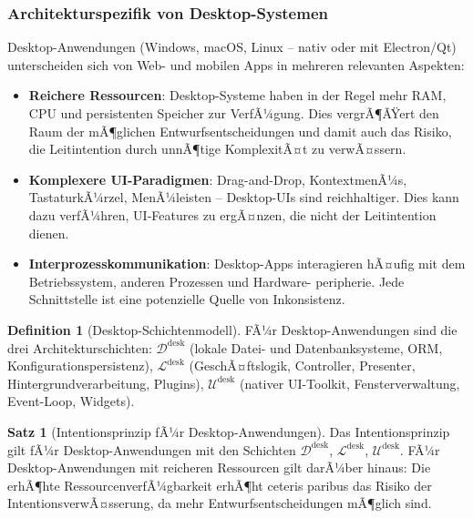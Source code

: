 ﻿\documentclass[a4paper,12pt]{article}
\theoremstyle{definition}
\newtheorem{definition}{Definition}
\newtheorem{satz}{Satz}
\begin{document}
\subsubsection{Architekturspezifik von Desktop-Systemen}

Desktop-Anwendungen (Windows, macOS, Linux -- nativ oder mit Electron/Qt)
unterscheiden sich von Web- und mobilen Apps in mehreren relevanten Aspekten:

\begin{itemize}
    \item \textbf{Reichere Ressourcen}: Desktop-Systeme haben in der Regel
          mehr RAM, CPU und persistenten Speicher zur VerfÃ¼gung. Dies vergrÃ¶ÃŸert
          den Raum der mÃ¶glichen Entwurfsentscheidungen und damit auch das
          Risiko, die Leitintention durch unnÃ¶tige KomplexitÃ¤t zu verwÃ¤ssern.
    \item \textbf{Komplexere UI-Paradigmen}: Drag-and-Drop, KontextmenÃ¼s,
          TastaturkÃ¼rzel, MenÃ¼leisten -- Desktop-UIs sind reichhaltiger.
          Dies kann dazu verfÃ¼hren, UI-Features zu ergÃ¤nzen, die nicht der
          Leitintention dienen.
    \item \textbf{Interprozesskommunikation}: Desktop-Apps interagieren
          hÃ¤ufig mit dem Betriebssystem, anderen Prozessen und Hardware-
          peripherie. Jede Schnittstelle ist eine potenzielle Quelle von
          Inkonsistenz.
\end{itemize}

\begin{definition}[Desktop-Schichtenmodell]
FÃ¼r Desktop-Anwendungen sind die drei Architekturschichten:
$\mathcal{D}^{\text{desk}}$ (lokale Datei- und Datenbanksysteme, ORM,
Konfigurationspersistenz),
$\mathcal{L}^{\text{desk}}$ (GeschÃ¤ftslogik, Controller, Presenter,
Hintergrundverarbeitung, Plugins),
$\mathcal{U}^{\text{desk}}$ (nativer UI-Toolkit, Fensterverwaltung,
Event-Loop, Widgets).
\end{definition}

\begin{satz}[Intentionsprinzip fÃ¼r Desktop-Anwendungen]\label{satz:desktop}
Das Intentionsprinzip gilt fÃ¼r Desktop-Anwendungen mit den Schichten
$\mathcal{D}^{\text{desk}}$, $\mathcal{L}^{\text{desk}}$,
$\mathcal{U}^{\text{desk}}$. FÃ¼r Desktop-Anwendungen mit reicheren
Ressourcen gilt darÃ¼ber hinaus: Die erhÃ¶hte RessourcenverfÃ¼gbarkeit
erhÃ¶ht ceteris paribus das Risiko der IntentionsverwÃ¤sserung, da
mehr Entwurfsentscheidungen mÃ¶glich sind.
\end{satz}
\end{document}
